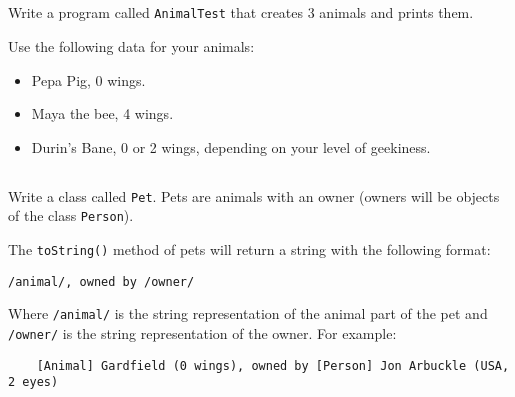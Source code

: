 \documentclass[a4paper, 11pt]{article}
\begin{document}
\subsection{}

Write a program called \verb+AnimalTest+ that creates 3 animals and prints
them.

Use the following data for your animals:

\begin{itemize}

  \item Pepa Pig, 0 wings.

  \item Maya the bee, 4 wings.

  \item Durin's Bane, 0 or 2 wings, depending on your level of geekiness.

\end{itemize}












\subsection{}

Write a class called \verb+Pet+. Pets are animals with an owner (owners will be
objects of the class \verb+Person+).

The \verb+toString()+ method of pets will return a string with the following
format:

\verb+/animal/, owned by /owner/+

Where \verb+/animal/+ is the string representation of the animal part of the
pet and \verb+/owner/+ is the string representation of the owner. For example:

\verb+    [Animal] Gardfield (0 wings), owned by [Person] Jon Arbuckle (USA, 2 eyes)+


\subsection{}
\end{document}
